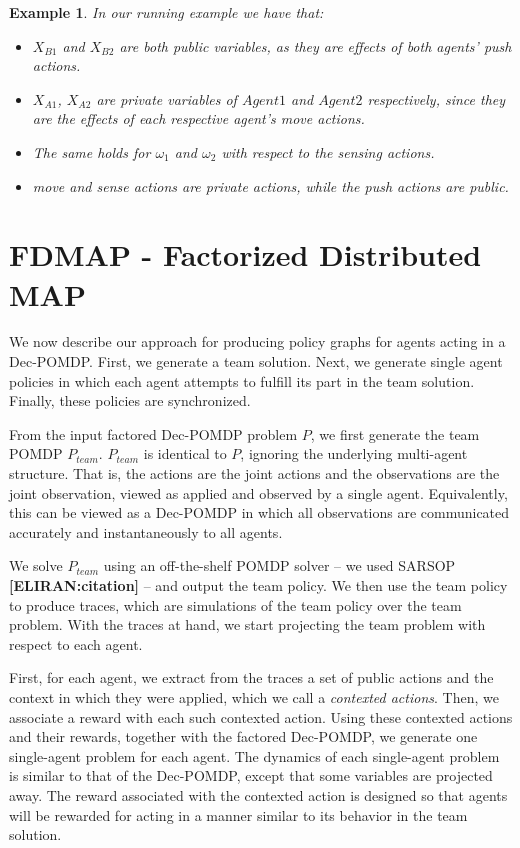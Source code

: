 \documentclass[letterpaper]{article} %
\newtheorem{example}{Example}
\newcommand{\eliran}[1]{\textbf{[\color{red}ELIRAN:#1]}}
\begin{document}
\begin{example}
In our running example we have that:
\begin{itemize}
    \item $X_{B1}$ and $X_{B2}$ are both public variables, as they are effects of both agents' push actions.
    \item $X_{A1}$, $X_{A2}$ are private variables of $Agent1$ and $Agent2$ respectively, since they are the effects of each respective agent's move actions.
    \item The same holds for $\omega_1$ and $\omega_2$ with respect to the sensing actions.
    \item move and sense actions are private actions, while the push actions are public.
\end{itemize}
\end{example}

\section{FDMAP - Factorized Distributed MAP}

We now describe our approach for producing policy graphs for agents acting in a Dec-POMDP. First, we generate a team solution. Next,
we generate single agent policies in which each agent attempts to fulfill its part in the team solution. Finally, these policies are synchronized. 

From the input factored Dec-POMDP problem $P$, we first generate the team POMDP $P_{team}$. $P_{team}$ is identical to $P$, ignoring the underlying multi-agent structure. That is, the actions are the joint actions and the observations are the joint observation, viewed as applied 
and observed by a single agent. Equivalently, this can be viewed as a Dec-POMDP in which all observations are communicated accurately and instantaneously 
to all agents.

We solve $P_{team}$ using an off-the-shelf POMDP solver --
we used SARSOP \cite{} \eliran{citation} -- and output the team policy. We then use the team policy to produce traces, which are simulations of the team policy over the team problem. With the traces at hand, we start projecting the team problem with respect to each agent.

First, for each agent, we extract from the traces a set of public actions and the context in which they were applied, which we call a {\em contexted actions}. Then, we associate a reward with each such contexted action.  Using these contexted actions and their rewards, together with the factored Dec-POMDP, we  generate
one single-agent problem for each agent. The dynamics of each single-agent problem is similar to that of the Dec-POMDP, except that some variables are projected away. The reward associated with the contexted action is designed
so that agents will be rewarded for acting in a manner similar to its
behavior in the team solution.
\end{document}
